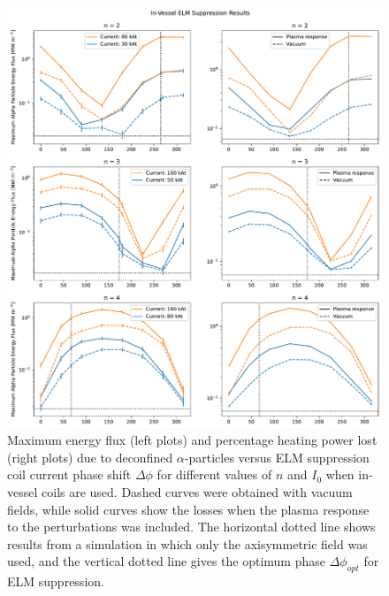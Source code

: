 \documentclass[10pt, a4paper, twoside]{article}
\begin{document}
\begin{figure}[!htb]
    \centering
    \includegraphics[width=0.99\linewidth]{Figures/max_and_total_flux_vs_phase_interior_rmp.pdf}
    \caption{Maximum energy flux (left plots) and percentage heating power lost (right plots) due to deconfined $\alpha$-particles versus ELM suppression coil current phase shift $\Delta\phi$ for different values of $n$ and $I_0$ when in-vessel coils are used. Dashed curves were obtained with vacuum fields, while solid curves show the losses when the plasma response to the perturbations was included. The horizontal dotted line shows results from a simulation in which only the axisymmetric field was used, and the vertical dotted line gives the optimum phase $\Delta \phi_{opt}$ for ELM suppression.}
    \label{fig:max_and_total_flux_vs_phase_elm_rwm}
\end{figure}
\end{document}
